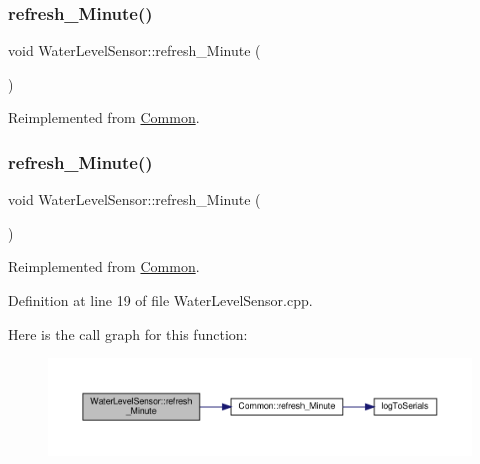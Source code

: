 \subsubsection{\texorpdfstring{refresh\+\_\+\+Minute()}{refresh\_Minute()}\hspace{0.1cm}{\footnotesize\ttfamily [1/2]}}
{\footnotesize\ttfamily void Water\+Level\+Sensor\+::refresh\+\_\+\+Minute (\begin{DoxyParamCaption}{ }\end{DoxyParamCaption})\hspace{0.3cm}{\ttfamily [virtual]}}



Reimplemented from \hyperlink{class_common_a14e4462a94bd118028ce1d487ca0292c}{Common}.

\mbox{\label{class_water_level_sensor_a3e3ab8ae53f09d5c0ac6df1b3ba3671f}} 
\subsubsection{\texorpdfstring{refresh\+\_\+\+Minute()}{refresh\_Minute()}\hspace{0.1cm}{\footnotesize\ttfamily [2/2]}}
{\footnotesize\ttfamily void Water\+Level\+Sensor\+::refresh\+\_\+\+Minute (\begin{DoxyParamCaption}{ }\end{DoxyParamCaption})\hspace{0.3cm}{\ttfamily [virtual]}}



Reimplemented from \hyperlink{class_common_a14e4462a94bd118028ce1d487ca0292c}{Common}.



Definition at line 19 of file Water\+Level\+Sensor.\+cpp.

Here is the call graph for this function\+:
\nopagebreak
\begin{figure}[H]
\begin{center}
\leavevmode
\includegraphics[width=350pt]{class_water_level_sensor_a3e3ab8ae53f09d5c0ac6df1b3ba3671f_cgraph}
\end{center}
\end{figure}
\mbox{\label{class_water_level_sensor_af9082a30fbe3af588c2bd3c82acfaf8e}} 
